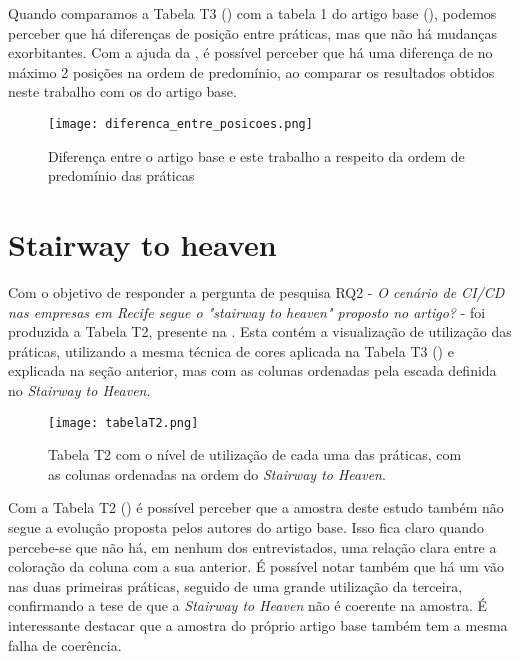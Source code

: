Quando comparamos a Tabela T3 () com a tabela 1 do artigo base (), podemos perceber que há diferenças de posição entre práticas, mas que não há mudanças exorbitantes. Com a ajuda da , é possível perceber que há uma diferença de no máximo 2 posições na ordem de predomínio, ao comparar os resultados obtidos neste trabalho com os do artigo base. 

\begin{figure}[ht]
\begin{center}
\texttt{[image: diferenca\_entre\_posicoes.png]}
\end{center}
\caption[Diferença entre a ordem de predomínio das práticas]{
    Diferença entre o artigo base e este trabalho a respeito da ordem de predomínio das práticas
}\label{diferenca_entre_posicoes_fig}
\end{figure}

\section{Stairway to heaven}

Com o objetivo de responder a pergunta de pesquisa RQ2 - \emph{ O cenário de CI/CD nas empresas em Recife segue o "stairway to heaven" proposto no artigo?} - foi produzida a Tabela T2, presente na . Esta contém a visualização de utilização das práticas, utilizando a mesma técnica de cores aplicada na Tabela T3 ()  e explicada na seção anterior, mas com as colunas ordenadas pela escada definida no \emph{Stairway to Heaven}.

\begin{figure}[ht]
\begin{center}
\texttt{[image: tabelaT2.png]}
\end{center}
\caption[Tabela T2]{
    Tabela T2 com o nível de utilização de cada uma das práticas, com as colunas ordenadas na ordem do \emph{Stairway to Heaven}.
}\label{tabela_t2}
\end{figure}

Com a Tabela T2 () é possível perceber que a amostra deste estudo também não segue a evolução proposta pelos autores do artigo base. Isso fica claro quando percebe-se que não há, em nenhum dos entrevistados, uma relação clara entre a coloração da coluna com a sua anterior. É possível notar também que há um vão nas duas primeiras práticas, seguido de uma grande utilização da terceira, confirmando a tese de que a \emph{Stairway to Heaven} não é coerente na amostra. É interessante destacar que a amostra do próprio artigo base também tem a mesma falha de coerência.

